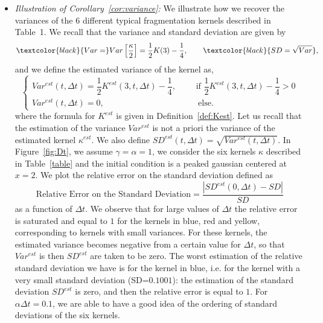 \documentclass[10pt]{amsart}
\theoremstyle{definition}\newtheorem{defi}[theo]{Definition}\newtheorem{rema}[theo]{Remark}\newtheorem{exam}[theo]{Example}\newtheorem{exem}[theo]{Example}\newtheorem{nota}[theo]{Notation}
\newcommand{\Mag}[1]{\textcolor{black}{#1}}
\begin{document}
\begin{itemize}
\item \emph{Illustration of Corollary~\ref{cor:variance}:\;} We illustrate how we recover the variances of the 6 different typical fragmentation kernels described in Table~1. We recall that the variance and standard deviation are given by
\begin{equation*}
\Mag{Var=} Var\left[\dfrac{\kappa}{2}\right] =\dfrac{1}{2}K(3)- \dfrac{1}{4}, \qquad \Mag{SD=\sqrt{Var}},
\end{equation*}
and we define the estimated variance of the kernel as,
\begin{equation*}
\begin{cases}
Var^{est}(t,\Delta t)=\dfrac{1}{2}K^{est}(3,t,\Delta t)- \dfrac{1}{4}, \qquad \text{ if }\dfrac{1}{2}K^{est}(3,t,\Delta t)- \dfrac{1}{4}>0\\
Var^{est}(t,\Delta t)=0, \qquad \qquad \qquad\hspace{2cm} \text{ else.}
\end{cases}
\end{equation*}
where the formula for $K^{est}$ is given in Definition~\ref{def:Kest}. Let us recall that the estimation of the variance $Var^{est}$ is not a priori the variance of the estimated kernel $\kappa^{est}$. We also define $SD^{est}(t,\Delta t)=\sqrt{Var^{est}(t,\Delta t)}$. In Figure~\ref{fig:Dt}, we assume $\gamma=\alpha=1$, we consider the six kernels $\kappa$ described in Table~\ref{table} and the initial condition is a peaked gaussian centered at $x=2$. We plot the relative error on the standard deviation defined as
\begin{equation*}
\text{Relative Error on the Standard Deviation}= \dfrac{|SD^{est}(0,\Delta t) - SD|}{{SD}}
\end{equation*}
as a function of $\Delta t$. We observe that for large values of $\Delta t$ the relative error is saturated and equal to $1$ for the kernels in blue, red and yellow, corresponding to kernels with small variances. For these kernels, the estimated variance becomes negative from a certain value for $\Delta t$, so that $Var^{est}$ is then $SD^{est}$ are taken to be zero. The worst estimation of the relative standard deviation we have is for the kernel in blue, i.e. for the kernel with a very small standard deviation (SD=$0.1001$): the estimation of the standard deviation $SD^{est}$ is zero, and then the relative error is equal to $1$. For $\alpha \Delta t=0.1$, we are able to have a good idea of the ordering of standard deviations of the six kernels.
\end{itemize}
\end{document}
